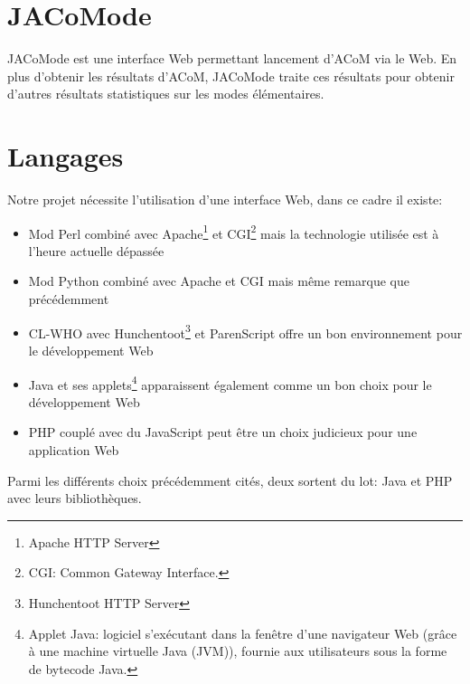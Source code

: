 \section{JACoMode}
JACoMode est une interface Web permettant lancement d'ACoM via le Web. En plus d'obtenir les résultats d'ACoM, JACoMode traite ces résultats pour obtenir d'autres résultats statistiques sur les modes élémentaires.

\section{Langages}
Notre projet nécessite l'utilisation d'une interface Web, dans ce cadre il existe:
\begin{itemize}
\item Mod Perl combiné avec Apache\footnote{Apache HTTP Server} et CGI\footnote{CGI: Common Gateway Interface.} mais la technologie utilisée est à l'heure actuelle dépassée
\item Mod Python combiné avec Apache et CGI mais même remarque que précédemment
\item CL-WHO avec Hunchentoot\footnote{Hunchentoot HTTP Server} et ParenScript offre un bon environnement pour le développement Web
\item Java et ses applets\footnote{Applet Java: logiciel s'exécutant dans la fenêtre d'une navigateur Web (grâce à une machine virtuelle Java (JVM)), fournie aux utilisateurs sous la forme de bytecode Java.} apparaissent également comme un bon choix pour le développement Web
\item PHP couplé avec du JavaScript peut être un choix judicieux pour une application Web
\end{itemize}

Parmi les différents choix précédemment cités, deux sortent du lot: Java et PHP avec leurs bibliothèques.